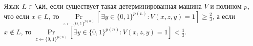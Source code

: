 Язык $L \in \AM$, если  существует такая детерминированная машина $V$ и полином $p$, что если $x \in L$, то
$\Pr\limits_{z \gets \{0, 1\}^{p(n)}}[\exists y \in \{0, 1\}^{p(n)}: V(x, z, y) = 1] \ge \frac{2}{3}$, а если $x \notin L$,
то $\Pr\limits_{z \gets \{0, 1\}^{p(n)}}[\exists y \in \{0, 1\}^{p(n)}: V(x, z, y) = 1] < \frac{1}{3}$.
